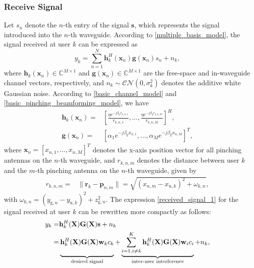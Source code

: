 \subsubsection{Receive Signal}
Let $s_n$ denote the $n$-th entry of the signal $\mathbf{s}$, which represents the signal introduced into the $n$-th waveguide. According to \eqref{multiple_basis_model}, the signal received at user $k$ can be expressed as 
\begin{equation} \label{received_signal_1}
    y_k = \sum_{n=1}^N \mathbf{h}_k^H(\mathbf{x}_n) \mathbf{g}(\mathbf{x}_n) s_n + n_k,
\end{equation} 
where $\mathbf{h}_k(\mathbf{x}_n) \in \mathbb{C}^{M \times 1}$ and $\mathbf{g}(\mathbf{x}_n) \in \mathbb{C}^{M \times 1}$ are the free-space and in-waveguide channel vectors, respectively, and $n_k \sim \mathcal{CN}(0, \sigma_k^2)$ denotes the additive white Gaussian noise. According to \eqref{basic_channel_model} and \eqref{basic_pinching_beamforming_model}, we have
\begin{align}
    \mathbf{h}_k(\mathbf{x}_n) = &\left[\frac{\eta e^{-j \beta_0 r_{k,n,1}}}{r_{k,n,1}},\dots,\frac{\eta e^{-j \beta_0 r_{k,n,M}}}{r_{k,n,M}}  \right]^H, \\
    \mathbf{g}(\mathbf{x}_n) = &\left[ \alpha_1 e^{-j \beta_{\mathrm{g}} x_{n, 1}},\dots,\alpha_M e^{-j \beta_{\mathrm{g}} x_{n, M}} \right]^T,
\end{align}
where $\mathbf{x}_n = [x_{n,1},\dots,x_{n,M}]^T$ denotes the x-axis position vector for all pinching antennas on the $n$-th waveguide, and $r_{k,n,m}$ denotes the distance between user $k$ and the $m$-th pinching antenna on the $n$-th waveguide, given by     
\begin{align}
    r_{k,n,m} = &\| \mathbf{r}_k - \mathbf{p}_{n,m} \| = \sqrt{ (x_{n,m} - x_{\mathrm{u},k})^2 + \omega_{k,n} },
\end{align}
with $\omega_{k,n} = (y_{\mathrm{g},n} - y_{\mathrm{u},k})^2 + z_{\mathrm{g},n}^2$. The expression \eqref{received_signal_1} for the signal received at user $k$ can be rewritten more compactly as follows:
\begin{align}
    y_k = & \mathbf{h}_k^H (\mathbf{X}) \mathbf{G}(\mathbf{X}) \mathbf{s} + n_k \nonumber \\
    = & \underbrace{\vphantom{\sum_{i=1, i\neq k}^K} \mathbf{h}_k^H (\mathbf{X}) \mathbf{G}(\mathbf{X}) \mathbf{w}_k c_k}_{\text{desired signal}} +  \underbrace{\sum_{i=1, i\neq k}^K \mathbf{h}_k^H (\mathbf{X}) \mathbf{G}(\mathbf{X}) \mathbf{w}_i c_i}_{\text{inter-user interference}} + n_k,
\end{align}
